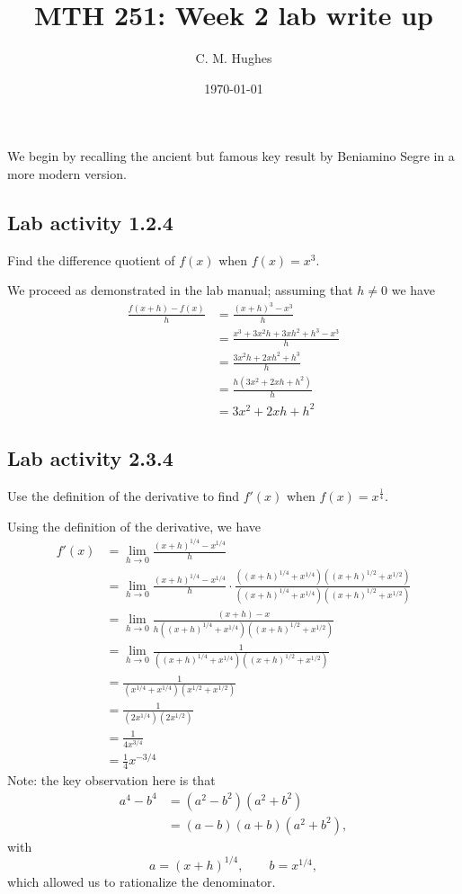 \documentclass{article}
\begin{document}
\title{MTH 251: Week 2 lab write up}
\author{C. M. Hughes}
\date{\today}
\maketitle

We begin by recalling the ancient but famous key result by Beniamino Segre in a more modern version.





\subsection*{Lab activity 1.2.4}
Find the difference quotient of $f(x)$ when $f(x)=x^3$.

We proceed as demonstrated in the lab manual; assuming that $h\ne 0$ 
we have
\begin{align*}
    \frac{f(x+h)-f(x)}{h} & =  \frac{(x+h)^3-x^3}{h}   \\
                          & =  \frac{x^3+3x^2h+3xh^2+h^3 - x^3}{h}\\
                          & =  \frac{3x^2h+2xh^2+h^3}{h}\\
                          & =  \frac{h(3x^2+2xh+h^2)}{h}\\
                          & =  3x^2+2xh+h^2
\end{align*} 

\subsection*{Lab activity 2.3.4}
Use the definition of the derivative to find $f'(x)$ when $f(x)=x^{\frac{1}{4}}$.

Using the definition of the derivative, we have
\begin{align*}
            f'(x)           &= \lim_{h\rightarrow 0}\frac{(x+h)^{1/4}-x^{1/4}}{h}   \\
                            &=  \lim_{h\rightarrow 0}\frac{(x+h)^{1/4}-x^{1/4}}{h}\cdot \frac{((x+h)^{1/4}+x^{1/4})((x+h)^{1/2}+x^{1/2})}{((x+h)^{1/4}+x^{1/4})((x+h)^{1/2}+x^{1/2})}\\
                            &=  \lim_{h\rightarrow 0}\frac{(x+h)-x}{h((x+h)^{1/4}+x^{1/4})((x+h)^{1/2}+x^{1/2})}    \\  
                            &=  \lim_{h\rightarrow 0}\frac{1}{((x+h)^{1/4}+x^{1/4})((x+h)^{1/2}+x^{1/2})}   \\
                            &= \frac{1}{(x^{1/4}+x^{1/4})(x^{1/2}+x^{1/2})} \\
                            &=  \frac{1}{(2x^{1/4})(2x^{1/2})}  \\
                            &=  \frac{1}{4x^{3/4}}  \\
                            &=  \frac{1}{4}x^{-3/4}
\end{align*}
Note: the key observation here is that
\begin{align*}
    a^4-b^4 &= (a^2-b^2)(a^2+b^2)   \\
        &= (a-b)(a+b)(a^2+b^2), 
\end{align*}
with 
\[
    a = (x+h)^{1/4}, \qquad b = x^{1/4},
\]
which allowed us to rationalize the denominator.
\end{document}
